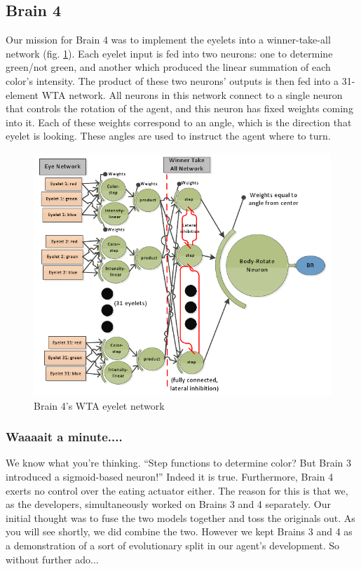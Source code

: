\subsection{Brain 4}

Our mission for Brain 4 was to implement the eyelets into a
winner-take-all network (fig. \ref{fig:brain4}). Each eyelet input is fed 
into two neurons: one  to determine green/not green, and 
another 
which produced the linear summation of each color's intensity. The product of 
these two neurons' outputs is then fed into a 31-element WTA network. All 
neurons in this network connect to a single neuron that controls the rotation 
of the agent, and this neuron has fixed weights coming into it. Each of these 
weights correspond to an angle, which is the direction that eyelet is looking. 
These angles are used to instruct the agent where to turn.

\begin{figure}
\begin{center}
  \includegraphics[scale=.62]{img/brain4.png}
  \caption{Brain 4's WTA eyelet network}
  \label{fig:brain4}
\end{center}
\end{figure}

\subsubsection{Waaaait a minute....}
We know what you're thinking. ``Step functions to determine color? But Brain 
3 introduced a sigmoid-based neuron!'' Indeed it is true. Furthermore, Brain
4 exerts no control over the eating actuator either. The reason for this is
that we, as the developers, simultaneously worked on Brains 3 and 4 separately.
Our initial thought was to fuse the two models together and toss the originals 
out. As you will see shortly, we did combine the two. However we kept Brains 
3 and 4 as a demonstration of a sort of evolutionary split in our agent's 
development. So without further ado...

